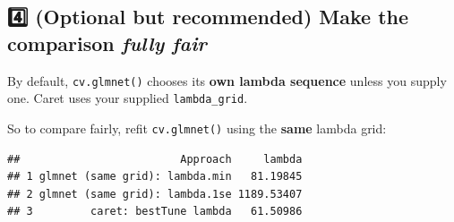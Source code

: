 \documentclass[
]{article}
\newenvironment{Shaded}{\begin{snugshade}}{\end{snugshade}}
\newcommand{\AttributeTok}[1]{\textcolor[rgb]{0.13,0.29,0.53}{#1}}
\newcommand{\CommentTok}[1]{\textcolor[rgb]{0.56,0.35,0.01}{\textit{#1}}}
\newcommand{\DecValTok}[1]{\textcolor[rgb]{0.00,0.00,0.81}{#1}}
\newcommand{\FloatTok}[1]{\textcolor[rgb]{0.00,0.00,0.81}{#1}}
\newcommand{\FunctionTok}[1]{\textcolor[rgb]{0.13,0.29,0.53}{\textbf{#1}}}
\newcommand{\NormalTok}[1]{#1}
\newcommand{\OtherTok}[1]{\textcolor[rgb]{0.56,0.35,0.01}{#1}}
\newcommand{\SpecialCharTok}[1]{\textcolor[rgb]{0.81,0.36,0.00}{\textbf{#1}}}
\newcommand{\StringTok}[1]{\textcolor[rgb]{0.31,0.60,0.02}{#1}}
\begin{document}
\subsection{\texorpdfstring{4️⃣ (Optional but recommended) Make the
comparison \emph{fully
fair}}{4️⃣ (Optional but recommended) Make the comparison fully fair}}\label{optional-but-recommended-make-the-comparison-fully-fair}

By default, \texttt{cv.glmnet()} chooses its \textbf{own lambda
sequence} unless you supply one. Caret uses your supplied
\texttt{lambda\_grid}.

So to compare fairly, refit \texttt{cv.glmnet()} using the \textbf{same}
lambda grid:

\begin{Shaded}
\end{Shaded}

\begin{verbatim}
##                         Approach     lambda
## 1 glmnet (same grid): lambda.min   81.19845
## 2 glmnet (same grid): lambda.1se 1189.53407
## 3         caret: bestTune lambda   61.50986
\end{verbatim}
\end{document}
